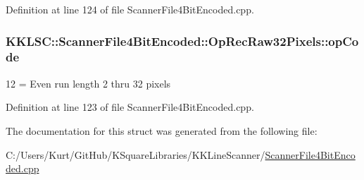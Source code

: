 Definition at line 124 of file Scanner\+File4\+Bit\+Encoded.\+cpp.

\subsubsection[{\texorpdfstring{op\+Code}{opCode}}]{ K\+K\+L\+S\+C\+::\+Scanner\+File4\+Bit\+Encoded\+::\+Op\+Rec\+Raw32\+Pixels\+::op\+Code}\hypertarget{struct_scanner_file4_bit_encoded_1_1_op_rec_raw32_pixels_a8b859461261a9f277cf53f3f29f6bfdf}{}\label{struct_scanner_file4_bit_encoded_1_1_op_rec_raw32_pixels_a8b859461261a9f277cf53f3f29f6bfdf}
12 = Even run length 2 thru 32 pixels 

Definition at line 123 of file Scanner\+File4\+Bit\+Encoded.\+cpp.



The documentation for this struct was generated from the following file\+:\begin{DoxyCompactItemize}
\item 
C\+:/\+Users/\+Kurt/\+Git\+Hub/\+K\+Square\+Libraries/\+K\+K\+Line\+Scanner/\hyperlink{_scanner_file4_bit_encoded_8cpp}{Scanner\+File4\+Bit\+Encoded.\+cpp}\end{DoxyCompactItemize}
